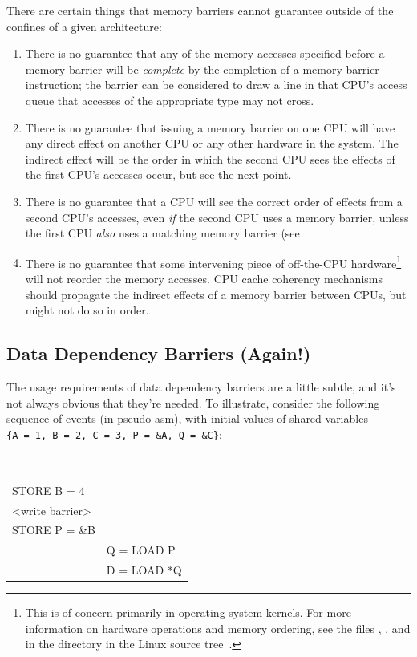 There are certain things that memory barriers cannot guarantee outside
of the confines of a given architecture:

\begin{enumerate}
\item	There is no guarantee that any of the memory accesses specified
	before a memory barrier will be \emph{complete} by the completion
	of a memory barrier instruction; the barrier can be considered
	to draw a line in that CPU's access queue that accesses of the
	appropriate type may not cross.
\item	There is no guarantee that issuing a memory barrier on one CPU
	will have any direct effect on another CPU or any other hardware
	in the system.	The indirect effect will be the order in which
	the second CPU sees the effects of the first CPU's accesses occur,
	but see the next point.
\item	There is no guarantee that a CPU will see the correct order
	of effects from a second CPU's accesses, even \emph{if} the second CPU
	uses a memory barrier, unless the first CPU \emph{also} uses a matching
	memory barrier (see
\item	There is no guarantee that some intervening piece of off-the-CPU
	hardware\footnote{
		This is of concern primarily in operating-system kernels.
		For more information on hardware operations and memory
		ordering, see the files , ,
		and  in the  directory in
		the Linux source tree~\cite{Torvalds2.6kernel}.}
	will not reorder the memory accesses.  CPU cache
	coherency mechanisms should propagate the indirect effects of
	a memory barrier between CPUs, but might not do so in order.
\end{enumerate}

\subsection{Data Dependency Barriers (Again!)}
\label{sec:memorder:Data Dependency Barriers}

The usage requirements of data dependency barriers are a little subtle, and
it's not always obvious that they're needed.  To illustrate, consider the
following sequence of events (in pseudo asm), with initial values of shared
variables
{\tt \{A~=~1, B~=~2, C~=~3, P~=~\&A, Q~=~\&C\}}:

\vspace{5pt}
\begin{minipage}[t]{\columnwidth}
\tt
\scriptsize
\begin{tabular}{l|l}
	\nf{CPU 1}	& \nf{CPU 2} \\
	\hline
	STORE B = 4	& \\
	<write barrier>	& \\
	STORE P = \&B	& \\
			& Q = LOAD P \\
			& D = LOAD *Q \\
\end{tabular}
\end{minipage}
\vspace{5pt}

